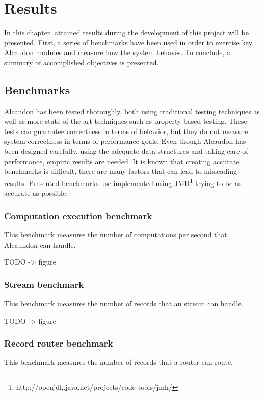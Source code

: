 \chapter{Results}

In this chapter, attained results during the development of this project will be
presented. First, a series of benchmarks have been used in order to
exercise key Alcaudon modules and measure how the system behaves. To conclude,
a summary of accomplished objectives is presented.

\section{Benchmarks}

Alcaudon has been tested thoroughly, both using traditional testing techniques
as well as more state-of-the-art techniques such as property based testing.
These tests can guarantee correctness in terms of behavior, but they do not
measure system correctness in terms of performance goals. Even though Alcaudon
has been designed carefully, using the adequate data structures and taking
care of performance, empiric results are needed. It is known that creating
accurate benchmarks is difficult\cite{benchbias}, there are many factors
that can lead to misleading results. Presented benchmarks use implemented using
JMH\footnote{http://openjdk.java.net/projects/code-tools/jmh/} trying to be as
accurate as possible.

\subsection{Computation execution benchmark}

This benchmark measures the number of computations per second that Alcaundon can
handle.

TODO -> figure

\subsection{Stream benchmark}

This benchmark measures the number of records that an stream can handle.

TODO -> figure

\subsection{Record router benchmark}

This benchmark measures the number of records that a router can route.

